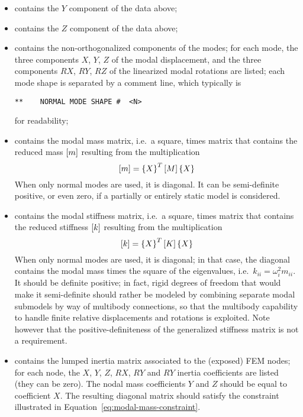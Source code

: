 \begin{itemize}
\item {} contains the $Y$ component of the data above;

\item {} contains the $Z$ component of the data above;

\item {} contains the non-orthogonalized components 
of the  modes; for each mode, the three components 
$X$, $Y$, $Z$ of the modal displacement, and the three components
$RX$, $RY$, $RZ$ of the linearized modal rotations are listed;
each mode shape is separated by a comment line, which typically is
\begin{verbatim}
**    NORMAL MODE SHAPE #  <N>
\end{verbatim}
for readability;

\item {} contains the modal mass matrix,
i.e.\ a square,  times  matrix that contains
the reduced mass $\left[ m \right]$ resulting from the multiplication
\begin{equation}
	\label{eq:modal-mass-constraint}
	\left[ m \right] = \left\{ X \right\}^T \left[ M \right] \left\{ X \right\}
\end{equation}
When only normal modes are used, it is diagonal.
It can be semi-definite positive, or even zero, if a partially 
or entirely static model is considered.

\item {} contains the modal stiffness matrix,
i.e.\ a square,  times  matrix that contains
the reduced stiffness $\left[ k \right]$ resulting from the multiplication
\begin{equation}
	\left[ k \right] = \left\{ X \right\}^T \left[ K \right] \left\{ X \right\}
\end{equation}
When only normal modes are used, it is diagonal; in that case,
the diagonal contains the modal mass times the square 
of the eigenvalues, i.e.\ $k_{ii} = \omega_i^2 m_{ii}$.
It should be definite positive; in fact, rigid degrees of freedom
that would make it semi-definite should rather be modeled by combining
separate modal submodels by way of multibody connections, so that
the multibody capability to handle finite relative displacements
and rotations is exploited.
Note however that the positive-definiteness of the generalized
stiffness matrix is not a requirement.

\item {} contains the lumped inertia matrix
associated to the  (exposed) FEM nodes;
for each node, the $X$, $Y$, $Z$, $RX$, $RY$ and $RY$ inertia
coefficients are listed (they can be zero).
The nodal mass coefficients $Y$ and $Z$ should be equal
to coefficient $X$.
The resulting diagonal matrix should satisfy the constraint
illustrated in Equation~\ref{eq:modal-mass-constraint}.


\end{itemize}
